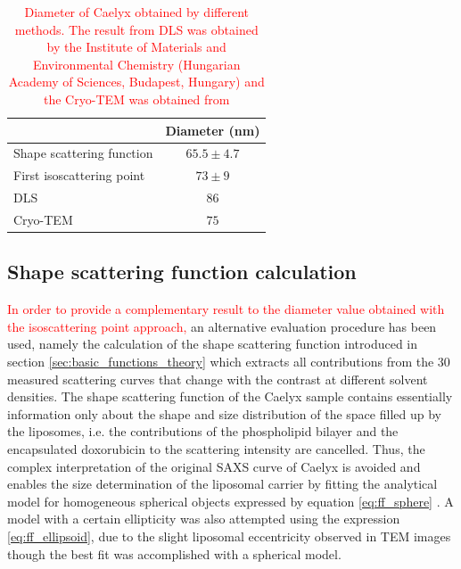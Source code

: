 \begin{table}
\caption[Diameter of Caelyx obtained by different methods.]{\textcolor{red}{Diameter of Caelyx obtained by different methods. The result from DLS was obtained by the Institute of Materials and Environmental Chemistry (Hungarian Academy of Sciences, Budapest, Hungary) and the Cryo-TEM was obtained from \cite{barenholz_liposome_2001}}}
\begin{tabular}{l|c}
& Diameter (nm)\\
\hline
Shape scattering function &  $65.5 \pm 4.7$ \\
First isoscattering point &  $73 \pm 9$   \\
DLS &  $86$   \\
Cryo-TEM &  $75$   \\ \hline
\end{tabular}
\label{tab:comparison_results_caelyx}
\end{table}

\subsection{Shape scattering function calculation}
\textcolor{red}{In order to provide a complementary result to the diameter value obtained with the isoscattering point approach,} an alternative evaluation procedure has been used, namely the calculation of the shape scattering function introduced in section \ref{sec:basic_functions_theory} which extracts all contributions from the 30 measured scattering curves that change with the contrast at different solvent densities. The shape scattering function of the Caelyx sample contains essentially information only about the shape and size distribution of the space filled up by the liposomes, i.e. the contributions of the phospholipid bilayer and the encapsulated doxorubicin to the scattering intensity are cancelled. Thus, the complex interpretation of the original SAXS curve of Caelyx is avoided and enables the size determination of the liposomal carrier by fitting the analytical model for homogeneous spherical objects expressed by equation \ref{eq:ff_sphere} . A model with a certain ellipticity was also attempted using the expression \ref{eq:ff_ellipsoid}, due to the slight liposomal eccentricity observed in TEM images \citep{barenholz_doxil-first_2012} though the best fit was accomplished with a spherical model. 

%		


